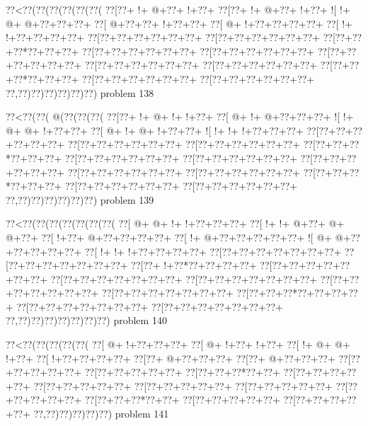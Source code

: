 \vbox{\vbox{\goo
\0??<\0??(\0??(\0??(\0??(\0??(\0??(
\0??[\0??+\- !+\- @+\0??+\- !+\0??+
\0??[\0??+\- !+\- @+\0??+\- !+\0??+
\- ![\- !+\- @+\- @+\0??+\0??+\0??+
\0??[\- @+\0??+\0??+\- !+\0??+\0??+
\0??[\- @+\- !+\0??+\0??+\0??+\0??+
\0??[\- !+\- !+\0??+\0??+\0??+\0??+
\0??[\0??+\0??+\0??+\0??+\0??+\0??+
\0??[\0??+\0??+\0??+\0??+\0??+\0??+
\0??[\0??+\0??+\0??*\0??+\0??+\0??+
\0??[\0??+\0??+\0??+\0??+\0??+\0??+
\0??[\0??+\0??+\0??+\0??+\0??+\0??+
\0??[\0??+\0??+\0??+\0??+\0??+\0??+
\0??[\0??+\0??+\0??+\0??+\0??+\0??+
\0??[\0??+\0??+\0??+\0??+\0??+\0??+
\0??[\0??+\0??+\0??*\0??+\0??+\0??+
\0??[\0??+\0??+\0??+\0??+\0??+\0??+
\0??[\0??+\0??+\0??+\0??+\0??+\0??+
\0??,\0??)\0??)\0??)\0??)\0??)\0??)
}
\hfil problem 138\hfil\break
}

\vbox{\vbox{\goo
\0??<\0??(\0??(\- @(\0??(\0??(\0??(
\0??[\0??+\- !+\- @+\- !+\- !+\0??+
\0??[\- @+\- !+\- @+\0??+\0??+\0??+
\- ![\- !+\- @+\- @+\- !+\0??+\0??+
\0??[\- @+\- !+\- @+\- !+\0??+\0??+
\- ![\- !+\- !+\- !+\0??+\0??+\0??+
\0??[\0??+\0??+\0??+\0??+\0??+\0??+
\0??[\0??+\0??+\0??+\0??+\0??+\0??+
\0??[\0??+\0??+\0??+\0??+\0??+\0??+
\0??[\0??+\0??+\0??*\0??+\0??+\0??+
\0??[\0??+\0??+\0??+\0??+\0??+\0??+
\0??[\0??+\0??+\0??+\0??+\0??+\0??+
\0??[\0??+\0??+\0??+\0??+\0??+\0??+
\0??[\0??+\0??+\0??+\0??+\0??+\0??+
\0??[\0??+\0??+\0??+\0??+\0??+\0??+
\0??[\0??+\0??+\0??*\0??+\0??+\0??+
\0??[\0??+\0??+\0??+\0??+\0??+\0??+
\0??[\0??+\0??+\0??+\0??+\0??+\0??+
\0??,\0??)\0??)\0??)\0??)\0??)\0??)
}
\hfil problem 139\hfil\break
}

\vbox{\vbox{\goo
\0??<\0??(\0??(\0??(\0??(\0??(\0??(\0??(
\0??[\- @+\- @+\- !+\- !+\0??+\0??+\0??+
\0??[\- !+\- !+\- @+\0??+\- @+\- @+\0??+
\0??[\- !+\0??+\- @+\0??+\0??+\0??+\0??+
\0??[\- !+\- @+\0??+\0??+\0??+\0??+\0??+
\- ![\- @+\- @+\0??+\0??+\0??+\0??+\0??+
\0??[\- !+\- !+\- !+\0??+\0??+\0??+\0??+
\0??[\0??+\0??+\0??+\0??+\0??+\0??+\0??+
\0??[\0??+\0??+\0??+\0??+\0??+\0??+\0??+
\0??[\0??+\- !+\0??*\0??+\0??+\0??+\0??+
\0??[\0??+\0??+\0??+\0??+\0??+\0??+\0??+
\0??[\0??+\0??+\0??+\0??+\0??+\0??+\0??+
\0??[\0??+\0??+\0??+\0??+\0??+\0??+\0??+
\0??[\0??+\0??+\0??+\0??+\0??+\0??+\0??+
\0??[\0??+\0??+\0??+\0??+\0??+\0??+\0??+
\0??[\0??+\0??+\0??*\0??+\0??+\0??+\0??+
\0??[\0??+\0??+\0??+\0??+\0??+\0??+\0??+
\0??[\0??+\0??+\0??+\0??+\0??+\0??+\0??+
\0??,\0??)\0??)\0??)\0??)\0??)\0??)\0??)
}
\hfil problem 140\hfil\break
}

\vbox{\vbox{\goo
\0??<\0??(\0??(\0??(\0??(\0??(
\0??[\- @+\- !+\0??+\0??+\0??+
\0??[\- @+\- !+\0??+\- !+\0??+
\0??[\- !+\- @+\- @+\- !+\0??+
\0??[\- !+\0??+\0??+\0??+\0??+
\0??[\0??+\- @+\0??+\0??+\0??+
\0??[\0??+\- @+\0??+\0??+\0??+
\0??[\0??+\0??+\0??+\0??+\0??+
\0??[\0??+\0??+\0??+\0??+\0??+
\0??[\0??+\0??+\0??*\0??+\0??+
\0??[\0??+\0??+\0??+\0??+\0??+
\0??[\0??+\0??+\0??+\0??+\0??+
\0??[\0??+\0??+\0??+\0??+\0??+
\0??[\0??+\0??+\0??+\0??+\0??+
\0??[\0??+\0??+\0??+\0??+\0??+
\0??[\0??+\0??+\0??*\0??+\0??+
\0??[\0??+\0??+\0??+\0??+\0??+
\0??[\0??+\0??+\0??+\0??+\0??+
\0??,\0??)\0??)\0??)\0??)\0??)
}
\hfil problem 141\hfil\break
}

